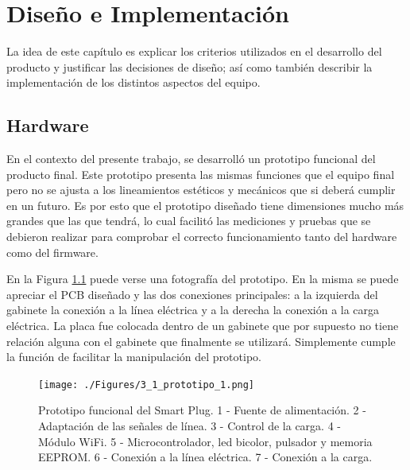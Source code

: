 \chapter{Diseño e Implementación} %

\label{Chapter3} %


La idea de este capítulo es explicar los criterios utilizados en el desarrollo del producto y justificar las decisiones de diseño; así como también describir la implementación de los distintos aspectos del equipo.

\section{Hardware}
\label{section:hardware}

En el contexto del presente trabajo, se desarrolló un prototipo funcional del producto final. Este prototipo presenta las mismas funciones que el equipo final pero no se ajusta a los lineamientos estéticos y mecánicos que si deberá cumplir en un futuro. Es por esto que el prototipo diseñado tiene dimensiones mucho más grandes que las que tendrá, lo cual facilitó las mediciones y pruebas que se debieron realizar para comprobar el correcto funcionamiento tanto del hardware como del firmware. 

En la Figura \ref{fig:prototipo} puede verse una fotografía del prototipo. En la misma se puede apreciar el PCB diseñado y las dos conexiones principales: a la izquierda del gabinete la conexión a la línea eléctrica y a la derecha la conexión a la carga eléctrica. La placa fue colocada dentro de un gabinete que por supuesto no tiene relación alguna con el gabinete que finalmente se utilizará. Simplemente cumple la función de facilitar la manipulación del prototipo.

\begin{figure}[h]
	\centering
	\texttt{[image: ./Figures/3\_1\_prototipo\_1.png]}
	\caption{Prototipo funcional del Smart Plug. 1 - Fuente de alimentación. 2 - Adaptación de las señales de línea. 3 - Control de la carga. 4 - Módulo WiFi. 5 - Microcontrolador, led bicolor, pulsador y memoria EEPROM. 6 - Conexión a la línea eléctrica. 7 - Conexión a la carga.}
	\label{fig:prototipo}
\end{figure}

